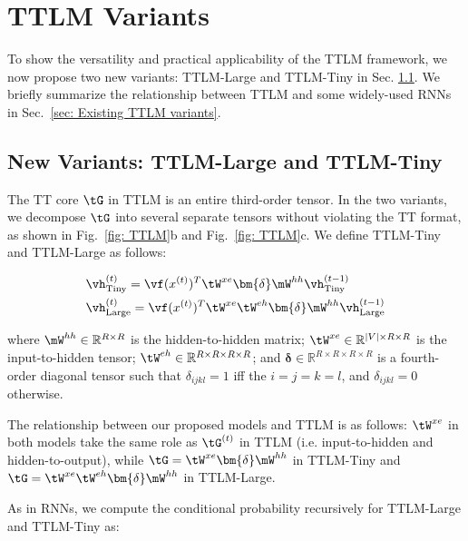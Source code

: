 \section{TTLM Variants}

To show the versatility and practical applicability of the TTLM framework, we now propose two new variants: TTLM-Large and TTLM-Tiny in Sec. \ref{sec: Tinyttlm}.  We briefly summarize the relationship between TTLM and some widely-used RNNs in Sec.\ \ref{sec: Existing  TTLM variants}.

\subsection{New Variants: TTLM-Large and TTLM-Tiny}
\label{sec: Tinyttlm}

The TT core $\tG$ in TTLM is an entire third-order tensor. In the two variants, we decompose $\tG$ into several separate tensors without violating the TT format, as shown in Fig.\ \ref{fig: TTLM}b and Fig.\ \ref{fig: TTLM}c. We define TTLM-Tiny and TTLM-Large as follows:

\begin{equation}
\begin{split}
& \vh^{(t)}_{\textrm{Tiny}} = \vf (x^{(t)})^T \tW^{xe} \bm{\delta} \mW^{hh}\vh^{(t-1)}_{\textrm{Tiny}}\\
& \vh^{(t)}_{\textrm{Large}}  = \vf (x^{(t)})^T \tW^{xe} \tW^{eh}  \bm{\delta} \mW^{hh}\vh^{(t-1)}_{\textrm{Large}}\\
\end{split}
\end{equation}

where $\mW^{hh} \in \mathbb{R}^{R \times R}$ is the hidden-to-hidden matrix;  $\tW^{xe} \in \mathbb{R}^{|V| \times R \times R}$ is the input-to-hidden tensor; $\tW^{eh} \in \mathbb{R}^{R \times R \times R \times R}$; and $\bm{\delta} \in  \mathbb{R}^{R \times R \times R \times R}$ is a fourth-order diagonal tensor such that $\delta_{ijkl} = 1$ if{f} the $i = j = k = l$, and $\delta_{ijkl} = 0$ otherwise.  


The relationship between our proposed models and TTLM is as follows: $\tW^{xe}$ in both models take the same role as $\tG^{(t)}$ in TTLM (i.e. input-to-hidden and hidden-to-output), while  $\tG = \tW^{xe} \bm{\delta} \mW^{hh}$ in TTLM-Tiny and $\tG = \tW^{xe} \tW^{eh} \bm{\delta} \mW^{hh}$ in TTLM-Large.   


As in RNNs, we compute the conditional probability recursively for TTLM-Large and TTLM-Tiny as:

